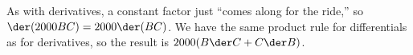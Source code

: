 As with derivatives, a constant factor just ``comes along for the ride,'' so
$\der(2000BC)=2000\der(BC)$.
We have the same product rule for differentials as for derivatives, so the result is $2000(B\der C+C\der B)$.
